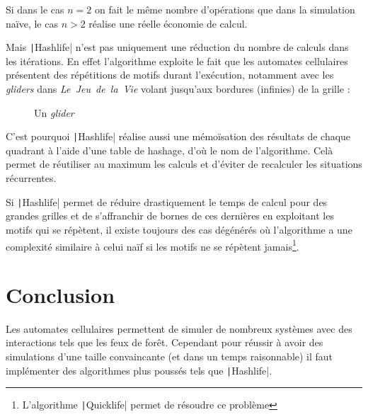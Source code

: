 \documentclass[12pt]{article}
\begin{document}
Si dans le cas $n=2$ on fait le même nombre d'opérations que dans la simulation naïve, le cas $n>2$ réalise une réelle économie de calcul.

Mais \texttt|Hashlife| n'est pas uniquement une réduction du nombre de calculs dans les itérations. En effet l'algorithme exploite le fait que les automates cellulaires présentent des répétitions de motifs durant l'exécution, notamment avec les \textit{gliders} dans \textit{Le~Jeu~de~la~Vie} volant jusqu'aux bordures (infinies) de la grille :

\begin{figure}[!ht]
    \centering
    \caption{Un \textit{glider}}
\end{figure}

C'est pourquoi \texttt|Hashlife| réalise aussi une mémoïsation des résultats de chaque quadrant à l'aide d'une table de hashage, d'où le nom de l'algorithme. Celà permet de réutiliser au maximum les calculs et d'éviter de recalculer les situations récurrentes.

Si \texttt|Hashlife| permet de réduire drastiquement le temps de calcul pour des grandes grilles et de s'affranchir de bornes de ces dernières en exploitant les motifs qui se répètent, il existe toujours des cas dégénérés où l'algorithme a une complexité similaire à celui naïf si les motifs ne se répètent jamais\footnote{L'algorithme \texttt|Quicklife| permet de résoudre ce problème}.

\section{Conclusion}

Les automates cellulaires permettent de simuler de nombreux systèmes avec des interactions tels que les feux de forêt. Cependant pour réussir à avoir des simulations d'une taille convaincante (et dans un temps raisonnable) il faut implémenter des algorithmes plus poussés tels que \texttt|Hashlife|.
\end{document}
